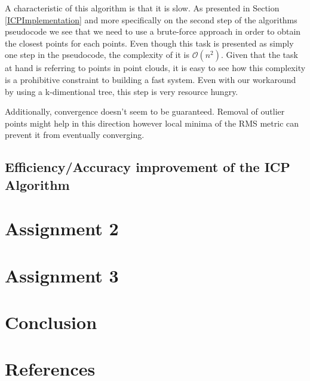 \documentclass[11pt]{article}
\begin{document}
A characteristic of this algorithm is that it is slow. As presented in Section \ref{ICPImplementation} and more specifically on the second step of the algorithms pseudocode we see that we need to use a brute-force approach in order to obtain the closest points for each points. Even though this task is presented as simply one step in the pseudocode, the complexity of it is $\mathcal{O}(n^2)$. Given that the task at hand is referring to points in point clouds, it is easy to see how this complexity is a prohibitive constraint to building a fast system. Even with our workaround by using a k-dimentional tree, this step is very resource hungry.

Additionally, convergence doesn't seem to be guaranteed. Removal of outlier points might help in this direction however local minima of the RMS metric can prevent it from eventually converging.

\subsection{Efficiency/Accuracy improvement of the ICP Algorithm}


\section{Assignment 2}

\section{Assignment 3}

\section{Conclusion}

\section{References}
\end{document}
